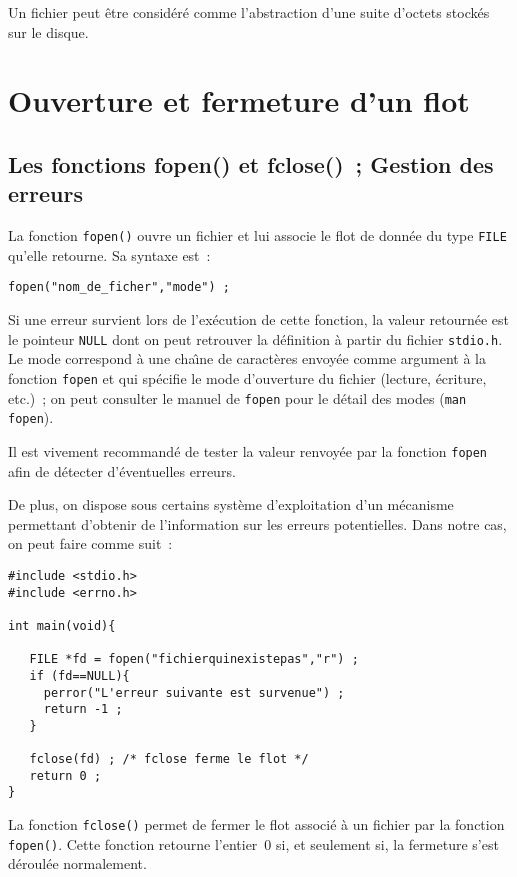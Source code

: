 Un fichier  peut \^etre consid\'er\'e  comme l'abstraction d'une suite
d'octets stock\'es sur le disque.
\section{Ouverture et fermeture d'un flot}
\label{sec:OuvertureEtFermetureFlot}
\subsection{Les fonctions fopen() et fclose()~; Gestion des erreurs}
\label{sec:fopenfcloseperror}
La  fonction \texttt{fopen()} ouvre un  fichier et lui associe le flot
de donn\'ee du type \texttt{FILE} qu'elle retourne. Sa syntaxe est~:
\begin{verbatim}
fopen("nom_de_ficher","mode") ;
\end{verbatim}
Si une  erreur survient  lors de  l'ex\'ecution  de cette fonction, la
valeur   retourn\'ee est   le   pointeur  \texttt{NULL} dont   on peut
retrouver la d\'efinition \`a  partir du fichier \texttt{stdio.h}.  Le
mode correspond  \`a une  cha\^\i{}ne de caract\`eres  envoy\'ee comme
argument \`a  la fonction \texttt{fopen}  et   qui sp\'ecifie le  mode
d'ouverture du fichier (lecture, \'ecriture, etc.)~; on peut consulter
le manuel de  \texttt{fopen} pour le  d\'etail des  modes (\texttt{man
  fopen}).
\par
Il est  vivement recommand\'e de  tester la  valeur renvoy\'ee par  la
fonction \texttt{fopen} afin de d\'etecter d'\'eventuelles erreurs.
\par
De  plus, on  dispose sous   certains   syst\`eme d'exploitation  d'un
m\'ecanisme   permettant  d'obtenir de l'information   sur les erreurs
potentielles. Dans notre cas, on peut faire comme suit~:
\begin{verbatim}
#include <stdio.h>
#include <errno.h>

int main(void){

   FILE *fd = fopen("fichierquinexistepas","r") ;
   if (fd==NULL){ 
     perror("L'erreur suivante est survenue") ;
     return -1 ;
   }

   fclose(fd) ; /* fclose ferme le flot */
   return 0 ;
}
\end{verbatim}
La fonction \texttt{fclose()} permet  de fermer le flot associ\'e  \`a
un fichier par la  fonction \texttt{fopen()}. Cette fonction  retourne
l'entier~$0$ si, et seulement   si,  la fermeture  s'est  d\'eroul\'ee
normalement.
